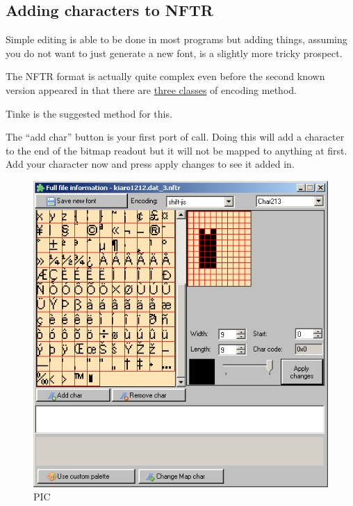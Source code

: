 \documentclass[
]{book}
\begin{document}
\hypertarget{adding-characters-to-nftr}{%
\subsection{Adding characters to NFTR}\label{adding-characters-to-nftr}}

Simple editing is able to be done in most programs but adding things, assuming you do not want to just generate a new font, is a slightly more tricky prospect.

The NFTR format is actually quite complex even before the second known version appeared in that there are \href{http://gbatemp.net/topic/105060-nftr-editor/page__view__findpost__p__1455382}{three classes} of encoding method.

Tinke is the suggested method for this.

The ``add char'' button is your first port of call. Doing this will add a character to the end of the bitmap readout but it will not be mapped to anything at first. Add your character now and press apply changes to see it added in.

\begin{figure}
\centering
\includegraphics{images/117_home_fast6191_romhackingguide_unrenamed_fil___nal_borders_romhackingguidefontnftradding_1.png}
\caption{PIC}
\end{figure}
\end{document}
